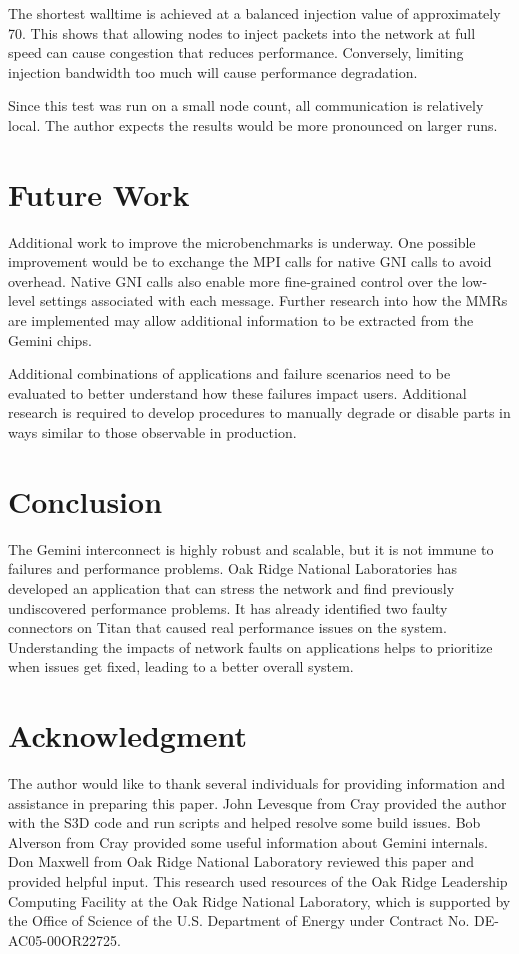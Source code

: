 \documentclass[10pt, conference, compsocconf]{IEEEtran}
\begin{document}
The shortest walltime is achieved at a balanced injection value of
approximately 70.  This shows that allowing nodes to inject packets into the
network at full speed can cause congestion that reduces performance.
Conversely, limiting injection bandwidth too much will cause performance
degradation.

Since this test was run on a small node count, all communication is relatively
local.  The author expects the results would be more pronounced on larger runs.

\section{Future Work}

Additional work to improve the microbenchmarks is underway.  One possible
improvement would be to exchange the MPI calls for native GNI calls to avoid
overhead.  Native GNI calls also enable more fine-grained control over the
low-level settings associated with each message.  Further research into how the
MMRs are implemented may allow additional information to be extracted from the
Gemini chips.

Additional combinations of applications and failure scenarios need to be
evaluated to better understand how these failures impact users.  Additional
research is required to develop procedures to manually degrade or disable parts
in ways similar to those observable in production.

\section{Conclusion}

The Gemini interconnect is highly robust and scalable, but it is not immune to
failures and performance problems.  Oak Ridge National Laboratories has
developed an application that can stress the network and find previously
undiscovered performance problems.  It has already identified two faulty
connectors on Titan that caused real performance issues on the system.
Understanding the impacts of network faults on applications helps to prioritize
when issues get fixed, leading to a better overall system.

\section*{Acknowledgment} The author would like to thank several individuals
for providing information and assistance in preparing this paper.  John
Levesque from Cray provided the author with the S3D code and run scripts and
helped resolve some build issues. Bob Alverson from Cray provided some useful
information about Gemini internals.  Don Maxwell from Oak Ridge National
Laboratory reviewed this paper and provided helpful input.  This research used
resources of the Oak Ridge Leadership Computing Facility at the Oak Ridge
National Laboratory, which is supported by the Office of Science of the U.S.
Department of Energy under Contract No. DE-AC05-00OR22725. 
\end{document}
